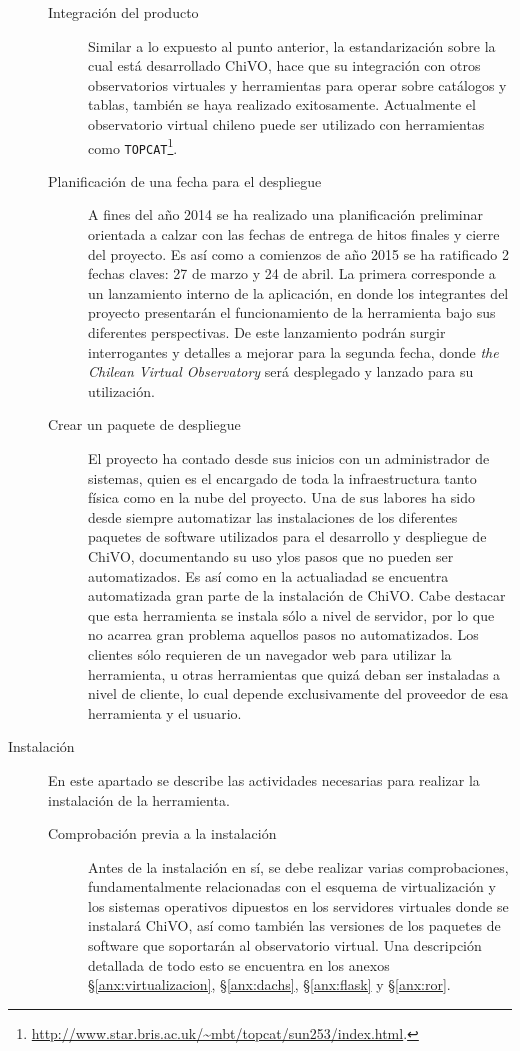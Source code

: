 \begin{description}
\begin{description}
			\item [Integración del producto] Similar a lo expuesto al punto anterior, la estandarización sobre la cual está desarrollado ChiVO, hace que su integración con otros observatorios virtuales y herramientas para operar sobre catálogos y tablas, tambi\'en se haya realizado exitosamente. Actualmente el observatorio virtual chileno puede ser utilizado con herramientas como \verb;TOPCAT;\footnote{\url{http://www.star.bris.ac.uk/~mbt/topcat/sun253/index.html}.}.
			\item [Planificación de una fecha para el despliegue] A fines del año 2014 se ha realizado una planificación preliminar orientada a calzar con las fechas de entrega de hitos finales y cierre del proyecto. Es así como a comienzos de año 2015 se ha ratificado 2 fechas claves: 27 de marzo y 24 de abril. La primera corresponde a un lanzamiento interno de la aplicación, en donde los integrantes del proyecto presentarán el funcionamiento de la herramienta bajo sus diferentes perspectivas. De este lanzamiento podrán surgir interrogantes y detalles a mejorar para la segunda fecha, donde \emph{the Chilean Virtual Observatory} será desplegado y lanzado para su utilización. 
			\item [Crear un paquete de despliegue] El proyecto ha contado desde sus inicios con un administrador de sistemas, quien es el encargado de toda la infraestructura tanto física como en la nube del proyecto. Una de sus labores ha sido desde siempre automatizar las instalaciones de los diferentes paquetes de software utilizados para el desarrollo y despliegue de ChiVO, documentando su uso ylos pasos que no pueden ser automatizados. Es así como en la actualiadad se encuentra automatizada gran parte de la instalación de ChiVO. Cabe destacar que esta herramienta se instala sólo a nivel de servidor, por lo que no acarrea gran problema aquellos pasos no automatizados. Los clientes sólo requieren de un navegador web para utilizar la herramienta, u otras herramientas que quizá deban ser instaladas a nivel de cliente, lo cual depende exclusivamente del proveedor de esa herramienta y el usuario.
		\end{description}
	\item [Instalación] En este apartado se describe las actividades necesarias para realizar la instalación de la herramienta.
		\begin{description}
			\item [Comprobación previa a la instalación] Antes de la instalación en sí, se debe realizar varias comprobaciones, fundamentalmente relacionadas con el esquema de virtualización y los sistemas operativos dipuestos en los servidores virtuales donde se instalará ChiVO, así como tambi\'en las versiones de los paquetes de software que soportarán al observatorio virtual. Una descripción detallada de todo esto se encuentra en los anexos \S\ref{anx:virtualizacion}, \S\ref{anx:dachs}, \S\ref{anx:flask} y \S\ref{anx:ror}.

\end{description}
\end{description}
